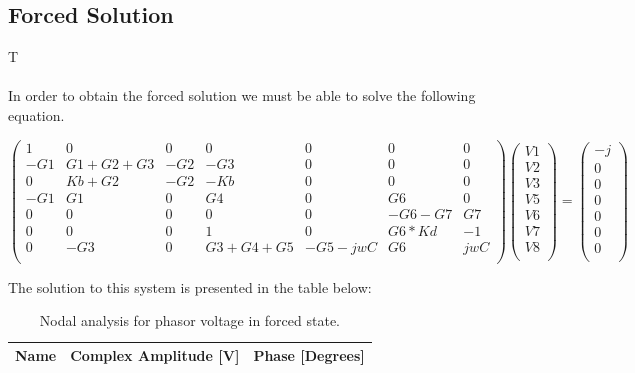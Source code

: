 \subsection{Forced Solution}

T\paragraph{} In order to obtain the forced solution we must be able to solve the following equation.  

\begin{equation}
\begin{pmatrix}
1 & 0 & 0 & 0 & 0 & 0 & 0\\
-G1 & G1+G2+G3 & -G2 & -G3 & 0 & 0 & 0\\
0 & Kb+G2 & -G2 & -Kb & 0 & 0 & 0\\
-G1 & G1 & 0 & G4 & 0 & G6 & 0\\
0 & 0 & 0 & 0 & 0 & -G6-G7 & G7\\
0 & 0 & 0 & 1 & 0 & G6*Kd & -1\\
0 & -G3 & 0 & G3+G4+G5 & -G5-jwC & G6 & jwC\\
\end{pmatrix}
\begin{pmatrix}
V1\\
V2\\
V3\\
V5\\
V6\\
V7\\
V8\\
\end{pmatrix}
=
\begin{pmatrix}
-j\\
0\\
0\\
0\\
0\\
0\\
0\\
\end{pmatrix}
\end{equation}


The solution to this system is presented in the table below:


\begin{table}[h]
  \centering
  \begin{tabular}{|l|r|r|}
    \hline    
    {\bf Name} & {\bf Complex Amplitude [V]} & {\bf Phase [Degrees]}\\ \hline
     
  \end{tabular}
  \caption{Nodal analysis for phasor voltage in forced state.}
  \label{tab:phasor}
\end{table}


